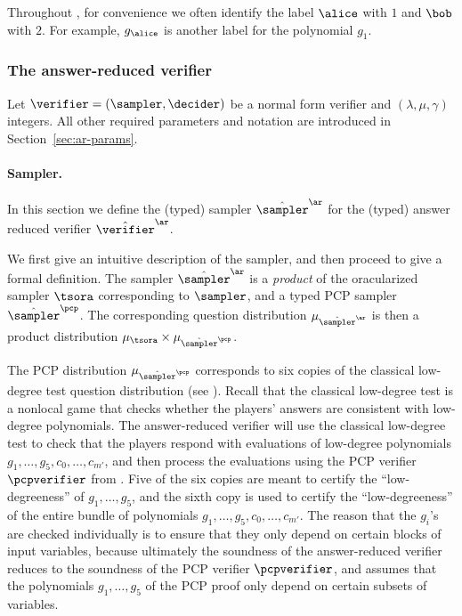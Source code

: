 \begin{remark}\label{rk:ab-01}
  Throughout , for convenience we often identify the label
  $\alice$ with $1$ and $\bob$ with $2$.
  For example, $g_\alice$ is another label for the polynomial $g_1$.
\end{remark}

\subsubsection{The answer-reduced verifier}
\label{sec:ar-verifier}

Let $\verifier = (\sampler, \decider)$ be a normal form verifier and
$(\lambda,\mu,\gamma)$ integers.
All other required parameters and notation are introduced in
Section~\ref{sec:ar-params}.

\newcommand{\tspcp}{\hat{\sampler}^\pcp}

\paragraph{Sampler.}
In this section we define the (typed) sampler $\tsans$ for the (typed) answer reduced
verifier $\tvans$. 

We first give an intuitive description of the sampler, and then proceed to give
a formal definition.
The sampler $\tsans$ is a \emph{product} of the oracularized sampler $\tsora$
corresponding to $\sampler$, and a typed PCP sampler $\tspcp$.
The corresponding question distribution $\mu_{\tsans}$ is then a product
distribution $\mu_{\tsora} \times \mu_{\tspcp}$.

The PCP distribution $\mu_{\tspcp}$ corresponds to six copies of the classical
low-degree test question distribution (see ).
Recall that the classical low-degree test is a nonlocal game that checks whether
the players' answers are consistent with low-degree polynomials.
The answer-reduced verifier will use the classical low-degree test to check that
the players respond with evaluations of low-degree polynomials
$g_1,\ldots,g_5,c_0,\ldots,c_{m'}$, and then process the evaluations using the
PCP verifier $\pcpverifier$ from .
Five of the six copies are meant to certify the ``low-degreeness'' of
$g_1,\ldots,g_5$, and the sixth copy is used to certify the ``low-degreeness''
of the entire bundle of polynomials $g_1,\ldots,g_5,c_0,\ldots,c_{m'}$.
The reason that the $g_i$'s are checked individually is to ensure that they only
depend on certain blocks of input variables, because ultimately the soundness of
the answer-reduced verifier reduces to the soundness of the PCP verifier
$\pcpverifier$, and  assumes that the polynomials
$g_1,\ldots,g_5$ of the PCP proof only depend on certain subsets of variables.

